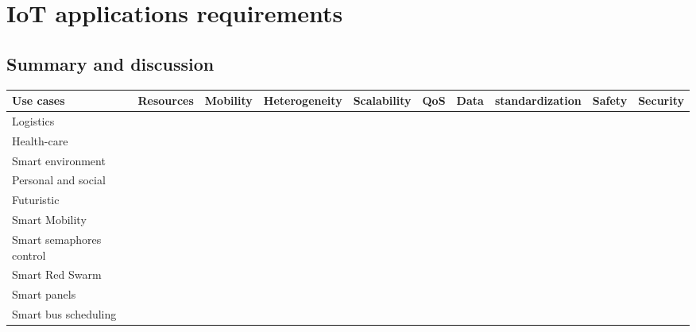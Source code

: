 \section{IoT applications requirements \cite{bregell_hardware_2015}} %
\label{sec:section_name}

\onecolumn
\subsection{Summary and discussion}

\begin{table}[h!]
\scriptsize
	\begin{tabulary}{\textwidth}{L|C|C|C|C|C|C|C|C|C}
	\textbf{Use cases}         & Resources  & Mobility & Heterogeneity & Scalability & QoS & Data & standardization & Safety & Security\\\hline
	Logistics                  &            &          &               &             &     &      &                 &        & \\\hline
	Health-care                &            &          &               &             &     &      &                 &        & \\\hline
	Smart environment          &            &          &               &             &     &      &                 &        & \\\hline
	Personal and social        &            &          &               &             &     &      &                 &        & \\\hline
	Futuristic                 &            &          &               &             &     &      &                 &        & \\\hline
	Smart Mobility             &            &          &               &             &     &      &                 &        & \\\hline
	Smart semaphores control   &            &          &               &             &     &      &                 &        & \\\hline
	Smart Red Swarm            &            &          &               &             &     &      &                 &        & \\\hline
	Smart panels               &            &          &               &             &     &      &                 &        & \\\hline
	Smart bus scheduling       &            &          &               &             &     &      &                 &        & \\\hline

\end{tabulary}
\end{table}
